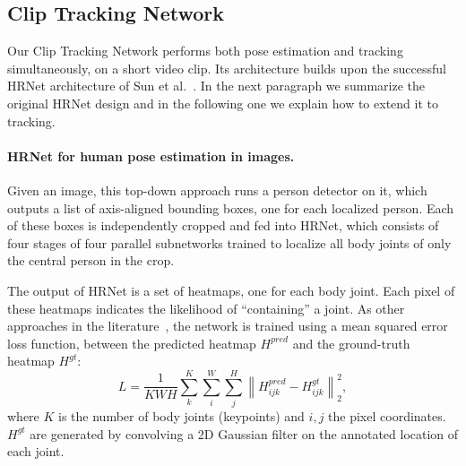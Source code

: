 \documentclass[10pt,twocolumn,letterpaper]{article}
\begin{document}
\subsection{Clip Tracking Network}\label{sec:3DHRnet}
Our Clip Tracking Network performs both pose estimation and tracking simultaneously, on a short video clip. Its architecture builds upon the successful HRNet architecture of Sun et al.~\cite{sun2019deep}. In the next paragraph we summarize the original HRNet design and in the following one we explain how to extend it to tracking.

\paragraph{HRNet for human pose estimation in images.} Given an image, this top-down approach runs a person detector on it, which outputs a list of axis-aligned bounding boxes, one for each localized person. Each of these boxes is independently cropped and fed into HRNet, which consists of four stages of four parallel subnetworks trained to localize all body joints of only the central person in the crop.

The output of HRNet is a set of heatmaps, one for each body joint. Each pixel of these heatmaps indicates the likelihood of ``containing'' a joint. 
As other approaches in the literature~\cite{cao2018openpose, insafutdinov16eccv, newell2017associative, pishchulin16cvpr,chen2018cascaded, he2017mask}, the network is trained using a mean squared error loss function, between the predicted heatmap  $H^{pred}$ and the ground-truth heatmap  $H^{gt}$:
\begin{equation}
L = \frac{1}{K W H}\sum_k^{K} \sum_i^W \sum_j^H \left\lVert H_{ijk}^{pred}-H_{ijk}^{gt} \right\rVert _2^2,
\label{eq:hrnet}
\end{equation}
where $K$ is the number of body joints (keypoints) and $i,j$ the pixel coordinates.  $H^{gt}$ are generated by convolving a 2D Gaussian filter on the annotated location of each joint. 
\end{document}
